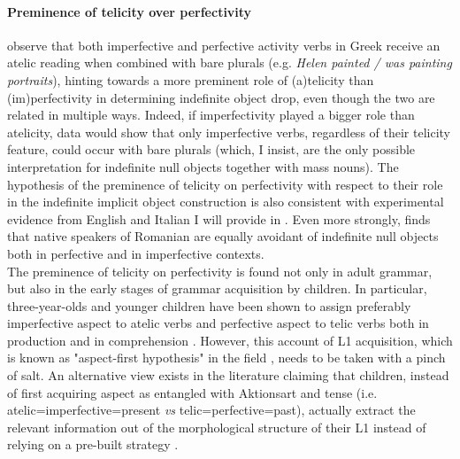 \paragraph{Preminence of telicity over perfectivity}
\textcite[1598]{TsimpliPapadopoulou2006} observe that both imperfective and perfective activity verbs in Greek receive an atelic reading when combined with bare plurals (e.g. \textit{Helen painted / was painting portraits}), hinting towards a more preminent role of (a)telicity than (im)perfectivity in determining indefinite object drop, even though the two are related in multiple ways. Indeed, if imperfectivity played a bigger role than atelicity, data would show that only imperfective verbs, regardless of their telicity feature, could occur with bare plurals (which, I insist, are the only possible interpretation for indefinite null objects together with mass nouns). The hypothesis of the preminence of telicity on perfectivity with respect to their role in the indefinite implicit object construction is also consistent with experimental evidence from English and Italian I will provide in . Even more strongly, \textcite{Stoica2017} finds that native speakers of Romanian are equally avoidant of indefinite null objects both in perfective and in imperfective contexts.\\
The preminence of telicity on perfectivity is found not only in adult grammar, but also in the early stages of grammar acquisition by children. In particular, three-year-olds and younger children have been shown to assign preferably imperfective aspect to atelic verbs and perfective aspect to telic verbs both in production and in comprehension \parencite{Medina2007, olsenEtAl1998acquiring, wagner2001aspectual}. However, this account of L1 acquisition, which is known as "aspect-first hypothesis" in the field \parencite{antinucci1976children}, needs to be taken with a pinch of salt. An alternative view exists in the literature claiming that children, instead of first acquiring aspect as entangled with Aktionsart and tense (i.e. atelic=imperfective=present \textit{vs} telic=perfective=past), actually extract the relevant information out of the morphological structure of their L1 instead of relying on a pre-built strategy \parencite{bertinetto2021acquisition, BertinettoLenciEtAl2015}.

